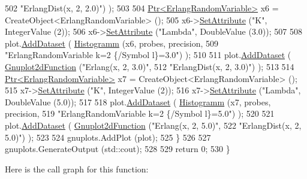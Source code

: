 \begin{DoxyCode}
502                                          \textcolor{stringliteral}{"ErlangDist(x, 2, 2.0)"}) );
503 
504     \hyperlink{classns3_1_1Ptr}{Ptr<ErlangRandomVariable>} x6 = CreateObject<ErlangRandomVariable> ();
505     x6->\hyperlink{classns3_1_1ObjectBase_ac60245d3ea4123bbc9b1d391f1f6592f}{SetAttribute} (\textcolor{stringliteral}{"K"}, IntegerValue (2));
506     x6->\hyperlink{classns3_1_1ObjectBase_ac60245d3ea4123bbc9b1d391f1f6592f}{SetAttribute} (\textcolor{stringliteral}{"Lambda"}, DoubleValue (3.0));
507 
508     plot.\hyperlink{classns3_1_1Gnuplot_a306ec724a327cf9ab699700f31fca0a1}{AddDataset} ( \hyperlink{main-random-variable-stream_8cc_a2cfd3837ab3f2e816cf53486d7a186b5}{Histogramm} (x6, probes, precision,
509                                   \textcolor{stringliteral}{"ErlangRandomVariable k=2 \{/Symbol l\}=3.0"}) );
510 
511     plot.\hyperlink{classns3_1_1Gnuplot_a306ec724a327cf9ab699700f31fca0a1}{AddDataset} ( \hyperlink{classns3_1_1Gnuplot2dFunction}{Gnuplot2dFunction} (\textcolor{stringliteral}{"Erlang(x, 2, 3.0)"},
512                                          \textcolor{stringliteral}{"ErlangDist(x, 2, 3.0)"}) );
513 
514     \hyperlink{classns3_1_1Ptr}{Ptr<ErlangRandomVariable>} x7 = CreateObject<ErlangRandomVariable> ();
515     x7->\hyperlink{classns3_1_1ObjectBase_ac60245d3ea4123bbc9b1d391f1f6592f}{SetAttribute} (\textcolor{stringliteral}{"K"}, IntegerValue (2));
516     x7->\hyperlink{classns3_1_1ObjectBase_ac60245d3ea4123bbc9b1d391f1f6592f}{SetAttribute} (\textcolor{stringliteral}{"Lambda"}, DoubleValue (5.0));
517 
518     plot.\hyperlink{classns3_1_1Gnuplot_a306ec724a327cf9ab699700f31fca0a1}{AddDataset} ( \hyperlink{main-random-variable-stream_8cc_a2cfd3837ab3f2e816cf53486d7a186b5}{Histogramm} (x7, probes, precision,
519                                   \textcolor{stringliteral}{"ErlangRandomVariable k=2 \{/Symbol l\}=5.0"}) );
520 
521     plot.\hyperlink{classns3_1_1Gnuplot_a306ec724a327cf9ab699700f31fca0a1}{AddDataset} ( \hyperlink{classns3_1_1Gnuplot2dFunction}{Gnuplot2dFunction} (\textcolor{stringliteral}{"Erlang(x, 2, 5.0)"},
522                                          \textcolor{stringliteral}{"ErlangDist(x, 2, 5.0)"}) );
523 
524     gnuplots.AddPlot (plot);
525   \}
526 
527   gnuplots.GenerateOutput (std::cout);
528 
529   \textcolor{keywordflow}{return} 0;
530 \}
\end{DoxyCode}


Here is the call graph for this function\+:


